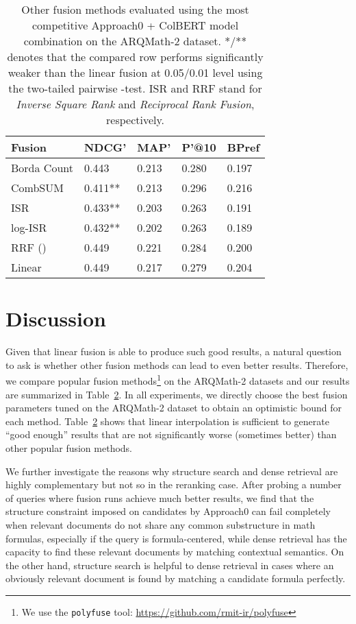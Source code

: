 \documentclass[11pt]{article}
\begin{document}
\begin{table}
\begin{table}
\small
\centering
\caption{\label{tab:fusion_other_than_linear}
Other fusion methods evaluated using the most competitive Approach0 + ColBERT model combination on the ARQMath-2 dataset.
*/** denotes that the compared row performs significantly weaker than the linear fusion at  0.05/0.01 level using the two-tailed pairwise -test.
ISR and RRF stand for \textit{Inverse Square Rank} and \textit{Reciprocal Rank Fusion}, respectively.
}
\begin{tabular}{l|llll}
\toprule
\bf Fusion & NDCG' & MAP' & P'@10 & BPref 
\\ \midrule
Borda Count & 0.443 & 0.213 & 0.280 & 0.197 \\
CombSUM & 0.411** & 0.213 & 0.296 & 0.216 \\ 
ISR & 0.433** & 0.203 & 0.263 & 0.191 \\
log-ISR & 0.432** & 0.202 & 0.263 & 0.189 \\ 
RRF () & 0.449 & 0.221 & 0.284 & 0.200 \\
\midrule
Linear & 0.449& 0.217&0.279& 0.204 \\
\bottomrule
\end{tabular}
\end{table}

\section{Discussion}
\label{sect:discussion}
Given that linear fusion is able to produce such good results, a natural question to ask is whether other fusion methods can lead to even better results.
Therefore, we compare popular fusion methods\footnote{We use the \texttt{polyfuse} tool: \url{https://github.com/rmit-ir/polyfuse}} on the ARQMath-2 datasets and our results are summarized in Table~\ref{tab:fusion_other_than_linear}.
In all experiments, we directly choose the best fusion parameters tuned on the ARQMath-2 dataset to obtain an optimistic bound for each method.
Table~\ref{tab:fusion_other_than_linear} shows that linear interpolation is sufficient to generate ``good enough'' results that are not significantly worse (sometimes better) than other popular fusion methods.

We further investigate the reasons why structure search and dense retrieval are highly complementary but not so in the reranking case.
After probing a number of queries where fusion runs achieve much better results, we find that the structure constraint imposed on candidates by Approach0 can fail completely when relevant documents do not share any common substructure in math formulas, especially if the query is formula-centered, while dense retrieval has the capacity to find these relevant documents by matching contextual semantics.
On the other hand, structure search is helpful to dense retrieval in cases where an obviously relevant document is found by matching a candidate formula perfectly.


\end{table}
\end{document}

